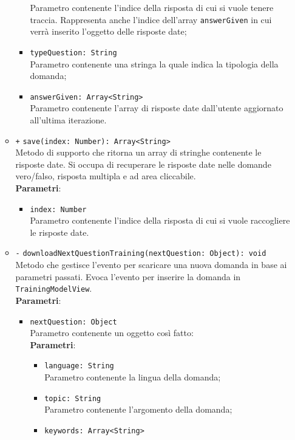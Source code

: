 \begin{itemize}
\begin{itemize}
\begin{itemize}
			Parametro contenente l'indice della risposta di cui si vuole tenere traccia. Rappresenta anche l'indice dell'array \texttt{answerGiven} in cui verrà inserito l'oggetto delle risposte date;
			\item \texttt{typeQuestion: String} \\
			Parametro contenente una stringa la quale indica la tipologia della domanda;
			\item \texttt{answerGiven: Array<String>} \\
			Parametro contenente l'array di risposte date dall'utente aggiornato all'ultima iterazione.
		\end{itemize}
		\item \texttt{+} \texttt{save(index: Number): Array<String>} \\
		Metodo di supporto che ritorna un array di stringhe contenente le risposte date. Si occupa di recuperare le risposte date nelle domande vero/falso, risposta multipla e ad area cliccabile.\\
		\textbf{Parametri}:
		\begin{itemize}
			\item \texttt{index: Number} \\
			Parametro contenente l'indice della risposta di cui si vuole raccogliere le risposte date. 
		\end{itemize}
		\item \texttt{-} \texttt{downloadNextQuestionTraining(nextQuestion: Object): void} \\
		Metodo che gestisce l'evento per scaricare una nuova domanda in base ai parametri passati. Evoca l'evento per inserire la domanda in \texttt{TrainingModelView}. \\
		\textbf{Parametri}:
		\begin{itemize}
			\item \texttt{nextQuestion: Object} \\
			Parametro contenente un oggetto così fatto: \\
			\textbf{Parametri}:
			\begin{itemize}
				\item \texttt{language: String} \\
				Parametro contenente la lingua della domanda;
				\item \texttt{topic: String} \\
				Parametro contenente l'argomento della domanda;
				\item \texttt{keywords: Array<String>} \\

\end{itemize}
\end{itemize}
\end{itemize}
\end{itemize}
